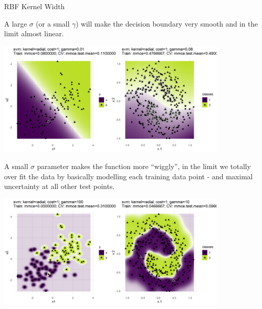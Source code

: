 \begin{vbframe}{RBF Kernel Width}

A large $\sigma$ (or a small $\gamma$) will make the decision boundary very smooth and in the limit almost linear. 

\begin{center}
\includegraphics[width = 11cm ]{figure/svm_rbf_kernel_gamma_1.png}
\end{center}

\framebreak

A small $\sigma$ parameter makes the function more \enquote{wiggly}, in the limit we totally over fit the data by basically modelling each training data point - and maximal uncertainty at all other test points.

\begin{center}
\includegraphics[width = 11cm ]{figure/svm_rbf_kernel_gamma_2.png}
\end{center}

\end{vbframe}
\endlecture

